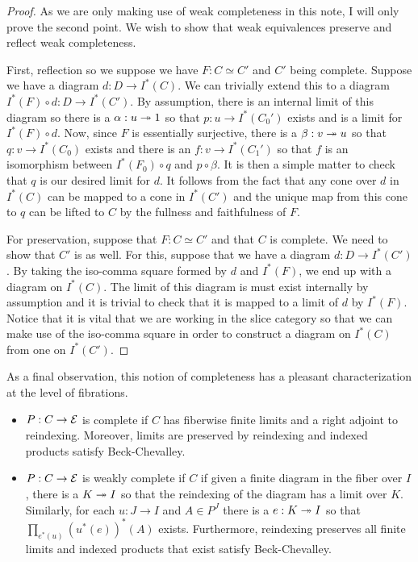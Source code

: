 \begin{proof}
  As we are only making use of weak completeness in this note, I will
  only prove the second point. We wish to show that weak equivalences
  preserve and reflect weak completeness.

  First, reflection so we suppose we have $F : C \simeq C'$ and $C'$
  being complete. Suppose we have a diagram $d : D \to I^*(C)$. We can
  trivially extend this to a diagram $I^*(F) \circ d : D \to I^*(C')$.
  By assumption, there is an internal limit of this diagram so there
  is a $\alpha : u \twoheadrightarrow 1$ so that $p : u \to I^*(C_0')$ exists and is
  a limit for $I^*(F) \circ d$. Now, since $F$ is essentially
  surjective, there is a $\beta : v \twoheadrightarrow u$ so that
  $q : v \to I^*(C_0)$ exists and there is an $f : v \to I^*(C_1')$ so
  that $f$ is an isomorphism between $I^*(F_0) \circ q$ and
  $p \circ \beta$. It is then a simple matter to check that $q$ is our
  desired limit for $d$. It follows from the fact that any cone over
  $d$ in $I^*(C)$ can be mapped to a cone in $I^*(C')$ and the unique
  map from this cone to $q$ can be lifted to $C$ by the fullness and
  faithfulness of $F$.

  For preservation, suppose that $F : C \simeq C'$ and that $C$ is
  complete. We need to show that $C'$ is as well. For this, suppose
  that we have a diagram $d : D \to I^*(C')$. By taking the iso-comma
  square formed by $d$ and $I^*(F)$, we end up with a diagram on
  $I^*(C)$. The limit of this diagram is must exist internally by
  assumption and it is trivial to check that it is mapped to a limit
  of $d$ by $I^*(F)$. Notice that it is vital that we are working in
  the slice category so that we can make use of the iso-comma square
  in order to construct a diagram on $I^*(C)$ from one on $I^*(C')$.
\end{proof}
As a final observation, this notion of completeness has a pleasant
characterization at the level of fibrations.
\begin{defn}\label{defn:complete:completefibration}\hfill
  \begin{itemize}
  \item $P : C \to \mathcal{E}$ is complete if $C$ has fiberwise finite
    limits and a right adjoint to reindexing. Moreover, limits are
    preserved by reindexing and indexed products satisfy
    Beck-Chevalley.
  \item $P : C \to \mathcal{E}$ is weakly complete if $C$ if given a finite
    diagram in the fiber over $I$, there is a $K \twoheadrightarrow I$ so that the
    reindexing of the diagram has a limit over $K$. Similarly, for
    each $u : J \to I$ and $A \in P^J$ there is a $e : K \twoheadrightarrow I$ so
    that $\prod_{e^*(u)} (u^*(e))^*(A)$ exists. Furthermore,
    reindexing preserves all finite limits and indexed products that
    exist satisfy Beck-Chevalley.
  \end{itemize}
\end{defn}
